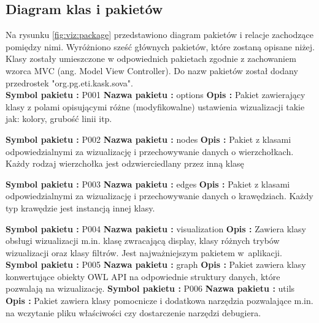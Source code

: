 \subsection{Diagram klas i pakietów}
Na rysunku \figurename \space \ref{fig:viz:package} przedstawiono diagram pakietów i relacje zachodzące pomiędzy nimi. Wyróżniono sześć głównych
 pakietów, które zostaną opisane niżej.  Klasy zostały umieszczone w odpowiednich pakietach zgodnie z zachowaniem wzorca MVC (ang. Model View Controller).
Do nazw pakietów został dodany przedrostek "org.pg.eti.kask.sova". \\
\pagebreak[3]
\noindent 
{\bf Symbol pakietu :} P001 \newline
{\bf Nazwa pakietu :} options \newline
{\bf Opis :}  Pakiet zawierający klasy z polami opisującymi różne (modyfikowalne) ustawienia wizualizacji takie jak: kolory, grubość linii itp.  \newline

\noindent 
{\bf Symbol pakietu :} P002 \newline
{\bf Nazwa pakietu :} nodes \newline
{\bf Opis :} Pakiet z klasami odpowiedzialnymi za wizualizację i przechowywanie danych o wierzchołkach. Każdy rodzaj wierzchołka jest odzwierciedlany przez inną klasę \newline

\noindent 
{\bf Symbol pakietu :} P003 \newline
{\bf Nazwa pakietu :} edges \newline
{\bf Opis :} Pakiet z klasami odpowiedzialnymi za wizualizację i przechowywanie danych o krawędziach. Każdy typ krawędzie jest instancją innej klasy. \newline

\noindent 
{\bf Symbol pakietu :} P004 \newline
{\bf Nazwa pakietu :} visualization \newline
{\bf Opis :} Zawiera klasy obsługi wizualizacji m.in. klasę zwracającą display, klasy różnych trybów wizualizacji oraz klasy filtrów. Jest najważniejszym pakietem 
w~aplikacji.  \newline
\newline
\noindent 
{\bf Symbol pakietu :} P005 \newline
{\bf Nazwa pakietu :} graph \newline
{\bf Opis :} Pakiet zawiera klasy konwertujące obiekty OWL API na odpowiednie struktury danych, które pozwalają na wizualizację. \newline
\newline
\noindent 
{\bf Symbol pakietu :} P006 \newline
{\bf Nazwa pakietu :} utils \newline
{\bf Opis :}  Pakiet zawiera klasy pomocnicze i dodatkowa narzędzia pozwalające m.in. na wczytanie pliku właściwości czy dostarczenie narzędzi debugiera.  \newline



